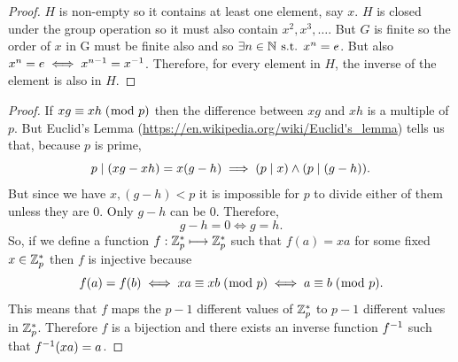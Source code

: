 \documentclass[MathsNotesBase.tex]{subfiles}
\begin{document}
{		
		\begin{proof}
			$H$ is non-empty so it contains at least one element, say ${ x }$. $H$ is closed under the group operation so it must also contain ${ x^2, x^3, \dots }$. But $G$ is finite so the order of $x$ in G must be finite also and so ${ \exists n \in \mathbb{N}^{} \text{ s.t. } x^n = e }$. But also ${ x^n = e \iff x^{n-1} = {x}^{-1} }$. Therefore, for every element in $H$, the inverse of the element is also in $H$.
		\end{proof}
	
		\begin{proof}
			If ${ xg \equiv xh \;(\bmod\; p) }$ then the difference between $xg$ and $xh$ is a multiple of $p$. But Euclid's Lemma (\url{https://en.wikipedia.org/wiki/Euclid's_lemma}) tells us that, because $p$ is prime, 
			\[ p \mid (xg - xh) = x(g - h) \implies (p \mid x) \wedge (p \mid (g-h)). \]
			But since we have ${ x,(g-h) < p }$ it is impossible for $p$ to divide either of them unless they are 0. Only ${ g-h }$ can be 0. Therefore,
			\[ g - h = 0 \iff g = h. \]
			So, if we define a function ${ f: \mathbb{Z}^{*}_p \longmapsto \mathbb{Z}^{*}_p }$ such that ${ f(a) = xa }$ for some fixed ${ x \in \mathbb{Z}^{*}_p }$ then $f$ is injective because
			\[ f(a) = f(b) \iff xa \equiv xb \;(\bmod\; p) \iff a \equiv b \;(\bmod\; p). \]
			This means that $f$ maps the ${ p-1 }$ different values of ${ \mathbb{Z}^{*}_p }$ to ${ p-1 }$ different values in ${ \mathbb{Z}^{*}_p }$. Therefore $f$ is a bijection and there exists an inverse function ${ {f}^{-1} }$ such that ${ {f}^{-1}(xa) = a }$.
		\end{proof}
	
		\medskip
}
\end{document}

